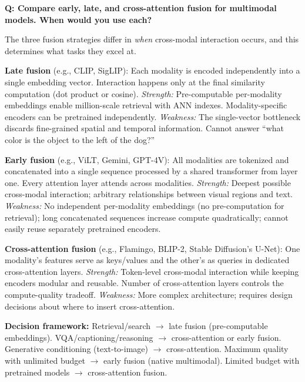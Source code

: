 \begin{interviewq}
\textbf{Q: Compare early, late, and cross-attention fusion for multimodal models. When would you use each?}

 \quad {} \quad \badgefreq{\freqhigh}

\stronganswer

The three fusion strategies differ in \textit{when} cross-modal interaction occurs, and this determines what tasks they excel at.

\textbf{Late fusion} (e.g., CLIP, SigLIP): Each modality is encoded independently into a single embedding vector. Interaction happens only at the final similarity computation (dot product or cosine). \textit{Strength:} Pre-computable per-modality embeddings enable million-scale retrieval with ANN indexes. Modality-specific encoders can be pretrained independently. \textit{Weakness:} The single-vector bottleneck discards fine-grained spatial and temporal information. Cannot answer ``what color is the object to the left of the dog?''

\textbf{Early fusion} (e.g., ViLT, Gemini, GPT-4V): All modalities are tokenized and concatenated into a single sequence processed by a shared transformer from layer one. Every attention layer attends across modalities. \textit{Strength:} Deepest possible cross-modal interaction; arbitrary relationships between visual regions and text. \textit{Weakness:} No independent per-modality embeddings (no pre-computation for retrieval); long concatenated sequences increase compute quadratically; cannot easily reuse separately pretrained encoders.

\textbf{Cross-attention fusion} (e.g., Flamingo, BLIP-2, Stable Diffusion's U-Net): One modality's features serve as keys/values and the other's as queries in dedicated cross-attention layers. \textit{Strength:} Token-level cross-modal interaction while keeping encoders modular and reusable. Number of cross-attention layers controls the compute-quality tradeoff. \textit{Weakness:} More complex architecture; requires design decisions about where to insert cross-attention.

\textbf{Decision framework:} Retrieval/search $\rightarrow$ late fusion (pre-computable embeddings). VQA/captioning/reasoning $\rightarrow$ cross-attention or early fusion. Generative conditioning (text-to-image) $\rightarrow$ cross-attention. Maximum quality with unlimited budget $\rightarrow$ early fusion (native multimodal). Limited budget with pretrained models $\rightarrow$ cross-attention fusion.


\end{interviewq}
